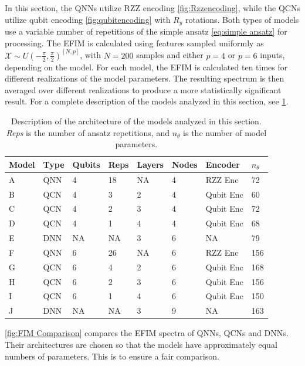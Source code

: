 In this section, the QNNs utilize RZZ encoding \cref{fig:Rzzencoding}, while the QCNs utilize qubit encoding \cref{fig:qubitencoding} with $R_y$ rotations. Both types of models use a variable number of repetitions of the simple ansatz \cref{eq:simple ansatz} for processing. The EFIM is calculated using features sampled uniformly as $\mathcal{X} \sim U(-\frac{\pi}{2}, \frac{\pi}{2})^{[N,p]}$, with $N=200$ samples and either $p=4$ or $p=6$ inputs, depending on the model. For each model, the EFIM is calculated ten times for different realizations of the model parameters. The resulting spectrum is then averaged over different realizations to produce a more statistically significant result. For a complete description of the models analyzed in this section, see \cref{tab:FIM models}.

\begin{table}[H]
\caption{Description of the architecture of the models analyzed in this section. \emph{Reps} is the number of ansatz repetitions, and $n_{\theta}$ is the number of model parameters.} 
\centering
\begin{tabular}{|l|l|l|l|l|l|l|l|}
\hline
Model &Type & Qubits& Reps & Layers & Nodes & Encoder        & $n_{\theta}$ \\ \hline
A    & QNN & 4& 18   & NA      & 4     & RZZ Enc   & 72  \\ \hline
B    & QCN & 4& 3    & 2      & 4     & Qubit Enc & 60 \\ \hline
C    & QCN & 4& 2    & 3      & 4     & Qubit Enc & 72  \\ \hline
D    & QCN & 4& 1    & 4      & 4     & Qubit Enc & 68  \\ \hline
E    & DNN & NA& NA   & 3      & 6     & NA             & 79 \\ \hline
F    & QNN & 6& 26   & NA      & 6     & RZZ Enc   & 156  \\ \hline
G    & QCN & 6& 4    & 2      & 6     & Qubit Enc & 168 \\ \hline
H    & QCN & 6& 2    & 3      & 6     & Qubit Enc & 156  \\ \hline
I    & QCN & 6& 1    & 4      & 6     & Qubit Enc & 150  \\ \hline
J    & DNN & NA& NA   & 3      & 9     & NA             & 163 \\ \hline
\end{tabular}
\label{tab:FIM models}
\end{table}

\cref{fig:FIM Comparison} compares the EFIM spectra of QNNs, QCNs and DNNs. Their architectures are chosen so that the models have approximately equal numbers of parameters. This is to ensure a fair comparison. 


